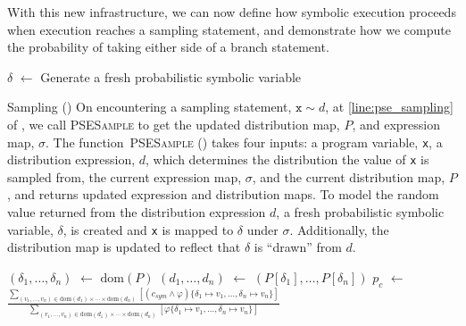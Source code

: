 \documentclass[acmsmall,review,anonymous]{acmart}\settopmatter{printfolios=true,printccs=false,printacmref=false}
\newcommand*\Let[2]{\State #1 $\gets$ #2}
\newcommand*\dom[1]{\mathrm{dom}\left( #1 \right)}
\begin{document}
With this new infrastructure, we can now define how symbolic execution proceeds when execution reaches a sampling statement, and demonstrate how we compute the probability of taking either side of a branch statement. 
\begin{algorithm}
	\caption{PSE Sampling Algorithm}
	\label{alg:sample}
	\begin{algorithmic}[1]
		\Let{$\delta$}{Generate a fresh probabilistic symbolic variable} \label{line:fresh_psv}
		\State{$\sigma[\mathtt{x}] = \delta$}
		 \label{line:update_P}
		\State{}
		\EndFunction
	\end{algorithmic}
\end{algorithm}
\begin{paragraph}{Sampling ()}
	On encountering a sampling statement, $\mathtt{x} \sim d$, at \cref{line:pse_sampling} of , we call \textsc{PSESample} to get the updated distribution map, $P$, and expression map, $\sigma$.
  The function~\textsc{PSESample} () takes four inputs: a program variable, \texttt{x}, a distribution expression, $d$, which determines the distribution the value of \texttt{x} is sampled from, the current expression map, $\sigma$, and the current distribution map, $P$, and returns updated expression and distribution maps.
  To model the random value returned from the distribution expression $d$, a fresh probabilistic symbolic variable, $\delta$, is created and \texttt{x} is mapped to $\delta$ under $\sigma$.
  Additionally, the distribution map is updated to reflect that $\delta$ is ``drawn'' from $d$.
\end{paragraph}
\begin{algorithm}
	\caption{PSE Branch Algorithm}
	\label{alg:branch}
	\begin{algorithmic}[1]
		\Let{$(\delta_1,\ldots,\delta_n)$}{$\dom{P}$}
		\Let{$(d_1,\ldots,d_n)$}{$(P[\delta_1],\ldots,P[\delta_n])$} 
		\Let{$p_c$}{$\frac{\displaystyle\sum_{(v_1,\ldots,v_n) \in \dom{d_1} \times \cdots\times \dom{d_n}} [(c_{sym} \wedge \varphi)\{\delta_1 \mapsto v_1,\ldots,\delta_n \mapsto v_n\}]}{\displaystyle\sum_{(v_1,\ldots,v_n) \in \dom{d_1} \times \cdots\times \dom{d_n}}[\varphi\{\delta_1 \mapsto v_1,\ldots,\delta_n \mapsto v_n\}]}$}\label{line:branch_prob_compute}
		\State{}
		\EndFunction
	\end{algorithmic}
\end{algorithm}
\end{document}
